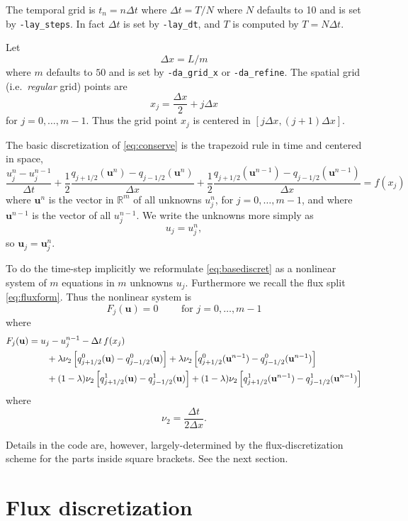 \documentclass[11pt]{amsart}
\newcommand\bu{\mathbf{u}}
\newcommand\RR{\mathbb{R}}
\begin{document}
The temporal grid is $t_n = n\Delta t$ where $\Delta t = T/N$ where $N$ defaults to 10 and is set by \verb|-lay_steps|.  In fact $\Delta t$ is set by \verb|-lay_dt|, and $T$ is computed by $T=N\Delta t$.

Let
  $$\Delta x = L / m$$
where $m$ defaults to $50$ and is set by \verb|-da_grid_x| or \verb|-da_refine|.  The spatial grid (i.e.~\emph{regular} grid) points are
    $$x_j = \frac{\Delta x}{2} + j \Delta x$$
for $j=0,\dots,m-1$.  Thus the grid point $x_j$ is centered in $[j\Delta x,(j+1)\Delta x]$.

The basic discretization of \eqref{eq:conserve} is the trapezoid rule in time and centered in space,
\begin{equation}
\frac{u_j^n - u_j^{n-1}}{\Delta t} + \frac{1}{2} \frac{q_{j+1/2}(\bu^n) - q_{j-1/2}(\bu^n)}{\Delta x} + \frac{1}{2} \frac{q_{j+1/2}(\bu^{n-1}) - q_{j-1/2}(\bu^{n-1})}{\Delta x} = f(x_j) \label{eq:basediscret}
\end{equation}
where $\bu^n$ is the vector in $\RR^m$ of all unknowns $u_j^n$, for $j=0,\dots,m-1$, and where $\bu^{n-1}$ is the vector of all $u_j^{n-1}$.  We write the unknowns more simply as
  $$u_j = u_j^n,$$
so $\bu_j = \bu_j^n$.

To do the time-step implicitly we reformulate \eqref{eq:basediscret} as a nonlinear system of $m$ equations in $m$ unknowns $u_j$.  Furthermore we recall the flux split \eqref{eq:fluxform}.  Thus the nonlinear system is
\begin{equation}
F_j(\bu) = 0 \qquad \text{ for } j = 0,\dots,m-1
\end{equation}
where
\begin{align}
F_j(\bu) &= u_j - u_j^{n-1} - \Delta t\,f(x_j)  \label{eq:defineFj} \\
   &\qquad + \lambda \nu_2 \left[q^0_{j+1/2}(\bu) - q^0_{j-1/2}(\bu)\right] + \lambda \nu_2 \left[q^0_{j+1/2}(\bu^{n-1}) - q^0_{j-1/2}(\bu^{n-1})\right] \notag \\
   &\qquad + (1-\lambda) \nu_2 \left[q^1_{j+1/2}(\bu) -  q^1_{j-1/2}(\bu)\right] + (1-\lambda) \nu_2 \left[q^1_{j+1/2}(\bu^{n-1}) - q^1_{j-1/2}(\bu^{n-1})\right] \notag
\end{align}
where
    $$\nu_2 = \frac{\Delta t}{2\Delta x}.$$

Details in the code are, however, largely-determined by the flux-discretization scheme for the parts inside square brackets.  See the next section.

\section{Flux discretization}
\end{document}
